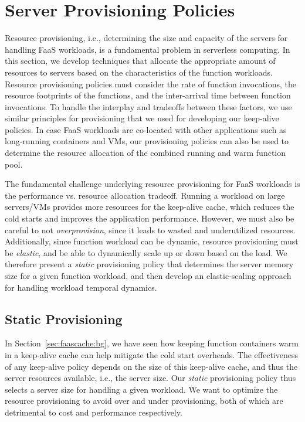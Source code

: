 \section{Server Provisioning Policies} %
\label{sec:provision}

Resource provisioning, i.e., determining the size and capacity of the servers for handling FaaS workloads, is a fundamental problem in serverless computing. 
In this section, we develop techniques that allocate the appropriate amount of resources to servers based on the characteristics of the function workloads. 
Resource provisioning policies must consider the rate of function invocations, the resource footprints of the functions, and the inter-arrival time between function invocations. 
To handle the interplay and tradeoffs between these factors, we use similar principles for provisioning that we used for developing our keep-alive policies. 
In case FaaS workloads are co-located with other applications such as long-running containers and VMs, our provisioning policies can also be used to determine the resource allocation of the combined running and warm function pool. 

The fundamental challenge underlying resource provisioning for FaaS workloads is the performance vs. resource allocation tradeoff. 
Running a workload on large servers/VMs provides more resources for the keep-alive cache, which reduces the cold starts and improves the application performance. 
However, we must also be careful to not \emph{overprovision}, since it leads to wasted and underutilized resources.
Additionally, since function workload can be dynamic, resource provisioning must be \emph{elastic}, and be able to dynamically scale up or down based on the load. 
We therefore present a \emph{static} provisioning policy that determines the server memory size for a given function workload, and then develop an elastic-scaling approach for handling workload temporal dynamics. 

\subsection{Static Provisioning}
\label{subsec:static}

In Section~\ref{sec:faascache:bg}, we have seen how keeping function containers warm in a keep-alive cache can help mitigate the cold start overheads. 
The effectiveness of any keep-alive policy depends on the size of this keep-alive cache, and thus the server resources available, i.e., the server size. 
Our \emph{static} provisioning policy thus selects a server size for handling a given workload. 
We want to optimize the resource provisioning to avoid over and under provisioning, both of which are detrimental to cost and performance respectively. 


